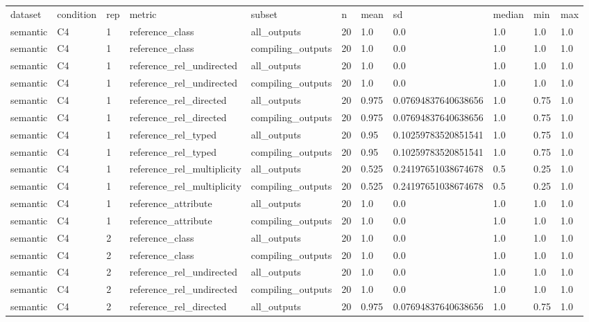 \begin{tabular}{lllllllllll}
dataset & condition & rep & metric & subset & n & mean & sd & median & min & max \\
semantic & C4 & 1 & reference\_class & all\_outputs & 20 & 1.0 & 0.0 & 1.0 & 1.0 & 1.0 \\
semantic & C4 & 1 & reference\_class & compiling\_outputs & 20 & 1.0 & 0.0 & 1.0 & 1.0 & 1.0 \\
semantic & C4 & 1 & reference\_rel\_undirected & all\_outputs & 20 & 1.0 & 0.0 & 1.0 & 1.0 & 1.0 \\
semantic & C4 & 1 & reference\_rel\_undirected & compiling\_outputs & 20 & 1.0 & 0.0 & 1.0 & 1.0 & 1.0 \\
semantic & C4 & 1 & reference\_rel\_directed & all\_outputs & 20 & 0.975 & 0.07694837640638656 & 1.0 & 0.75 & 1.0 \\
semantic & C4 & 1 & reference\_rel\_directed & compiling\_outputs & 20 & 0.975 & 0.07694837640638656 & 1.0 & 0.75 & 1.0 \\
semantic & C4 & 1 & reference\_rel\_typed & all\_outputs & 20 & 0.95 & 0.10259783520851541 & 1.0 & 0.75 & 1.0 \\
semantic & C4 & 1 & reference\_rel\_typed & compiling\_outputs & 20 & 0.95 & 0.10259783520851541 & 1.0 & 0.75 & 1.0 \\
semantic & C4 & 1 & reference\_rel\_multiplicity & all\_outputs & 20 & 0.525 & 0.24197651038674678 & 0.5 & 0.25 & 1.0 \\
semantic & C4 & 1 & reference\_rel\_multiplicity & compiling\_outputs & 20 & 0.525 & 0.24197651038674678 & 0.5 & 0.25 & 1.0 \\
semantic & C4 & 1 & reference\_attribute & all\_outputs & 20 & 1.0 & 0.0 & 1.0 & 1.0 & 1.0 \\
semantic & C4 & 1 & reference\_attribute & compiling\_outputs & 20 & 1.0 & 0.0 & 1.0 & 1.0 & 1.0 \\
semantic & C4 & 2 & reference\_class & all\_outputs & 20 & 1.0 & 0.0 & 1.0 & 1.0 & 1.0 \\
semantic & C4 & 2 & reference\_class & compiling\_outputs & 20 & 1.0 & 0.0 & 1.0 & 1.0 & 1.0 \\
semantic & C4 & 2 & reference\_rel\_undirected & all\_outputs & 20 & 1.0 & 0.0 & 1.0 & 1.0 & 1.0 \\
semantic & C4 & 2 & reference\_rel\_undirected & compiling\_outputs & 20 & 1.0 & 0.0 & 1.0 & 1.0 & 1.0 \\
semantic & C4 & 2 & reference\_rel\_directed & all\_outputs & 20 & 0.975 & 0.07694837640638656 & 1.0 & 0.75 & 1.0 \\

\end{tabular}
